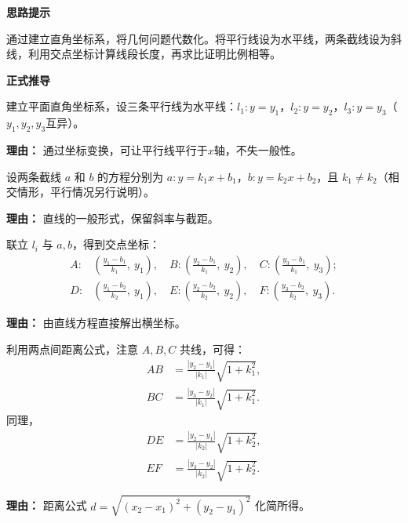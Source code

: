 \begin{proofbox}
	\textbf{\textcolor{CProof}{思路提示}}

	通过建立直角坐标系，将几何问题代数化。将平行线设为水平线，两条截线设为斜线，利用交点坐标计算线段长度，再求比证明比例相等。

	\medskip
	\textbf{\textcolor{CProof}{正式推导}}
	\begin{description}[style=nextline, leftmargin=2.8em, labelsep=0.5em, itemsep=0.55em]
		\item[\textbf{步骤一（设坐标）：}] 建立平面直角坐标系，设三条平行线为水平线：$l_1: y = y_1$，$l_2: y = y_2$，$l_3: y = y_3$（$y_1, y_2, y_3$互异）。
			\par\textbf{理由：}
			通过坐标变换，可让平行线平行于$x$轴，不失一般性。

		\item[\textbf{步骤二（设截线方程）：}] 设两条截线 $a$ 和 $b$ 的方程分别为 $a: y = k_1x + b_1$，$b: y = k_2x + b_2$，且 $k_1\neq k_2$（相交情形，平行情况另行说明）。
			\par\textbf{理由：}
			直线的一般形式，保留斜率与截距。

		\item[\textbf{步骤三（求交点坐标）：}] 联立 $l_i$ 与 $a,b$，得到交点坐标：
			\[
				\begin{aligned}
					A:&\left(\frac{y_1-b_1}{k_1},\ y_1\right),\quad B:\left(\frac{y_2-b_1}{k_1},\ y_2\right),\quad C:\left(\frac{y_3-b_1}{k_1},\ y_3\right);\\    D:&\left(\frac{y_1-b_2}{k_2},\ y_1\right),\quad E:\left(\frac{y_2-b_2}{k_2},\ y_2\right),\quad F:\left(\frac{y_3-b_2}{k_2},\ y_3\right).
			\end{aligned}
			\]
			\par\textbf{理由：}
			由直线方程直接解出横坐标。

		\item[\textbf{步骤四（计算线段长度）：}] 利用两点间距离公式，注意 $A,B,C$ 共线，可得：
			\[
				\begin{aligned}
					AB &= \frac{|y_2-y_1|}{|k_1|}\sqrt{1+k_1^2},\\    BC &= \frac{|y_3-y_2|}{|k_1|}\sqrt{1+k_1^2}.
			\end{aligned}
			\]
			同理，
			\[
				\begin{aligned}
					DE &= \frac{|y_2-y_1|}{|k_2|}\sqrt{1+k_2^2},\\    EF &= \frac{|y_3-y_2|}{|k_2|}\sqrt{1+k_2^2}.
			\end{aligned}
			\]
			\par\textbf{理由：}
			距离公式 $d=\sqrt{(x_2-x_1)^2+(y_2-y_1)^2}$ 化简所得。


\end{description}
\end{proofbox}
